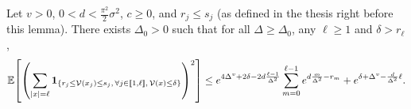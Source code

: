 \begin{lemma}[Lemma 3.8]
Let $v>0$, $0<d<\frac{\pi^2}2\sigma^2$, $c\ge 0$, and $r_j\le s_j$ (as defined in the thesis right before this lemma).
There exists $\Delta_0>0$ such that for all $\Delta\ge\Delta_0$, any $\ell\ge 1$ and $\delta>r_\ell$,
\begin{equation*}
    \mathbb E\!\left[
        \left(
            \sum_{|x|=\ell}
            {\bf 1}_{
                \{
                    r_j\le\mathcal V(x_j)\le s_j,\,
                    \forall j\in[\![1,\ell]\!],\,
                    \mathcal V(x)\le\delta
                \}
            }
        \right)^2
    \right]
    \le
    e^{4\Delta^v+2\delta-2d\frac{\ell-1}{\Delta^2}}
    \sum_{m=0}^{\ell-1}
    e^{d\frac m{\Delta^2}-r_m}
    +
    e^{\delta+\Delta^v-\frac d{\Delta^2}\ell}.
\end{equation*}
\end{lemma}
